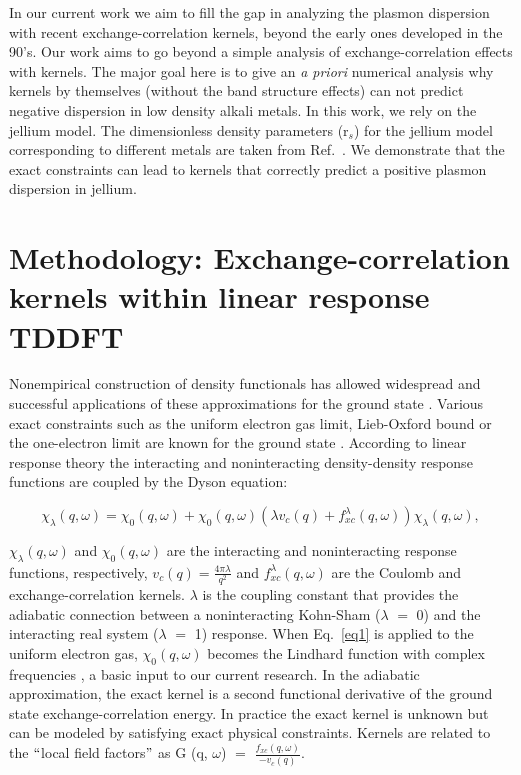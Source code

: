 \documentclass[aps,amsmath,amssymb, preprint, 12pt]{revtex4-1}
\begin{document}
In our current work we aim to fill the gap in analyzing the plasmon dispersion with recent exchange-correlation kernels, beyond the early ones developed in the 90's. Our work aims to go beyond a simple analysis of exchange-correlation effects with kernels. The major goal here is to give an \textit{a priori }numerical analysis why kernels by themselves (without the band structure effects) can not predict negative dispersion in low density alkali metals. In this work, we rely on the jellium model. The dimensionless density parameters (r$_s$) for the jellium model corresponding to different metals are taken from Ref.~\cite{AM05}. We demonstrate that the exact constraints can lead to kernels that correctly predict a positive plasmon dispersion in jellium.

\section{Methodology: Exchange-correlation kernels within linear response TDDFT}

Nonempirical construction of density functionals has allowed widespread and successful applications of these approximations for the ground state \cite{SRZSRP16}. Various exact constraints such as the uniform electron gas limit, Lieb-Oxford bound or the one-electron limit are known for the ground state \cite{PRTSSC05}. According to linear response theory the interacting and noninteracting density-density response functions are coupled by the Dyson equation:

\begin{equation}
\chi _{ \lambda } \left( q, \omega  \right) =  \chi _{0} \left( q, \omega  \right) + \chi _{0} \left( q, \omega  \right)  \left(  \lambda v_{c} \left( q \right) +f_{xc}^{ \lambda } \left( q, \omega  \right)  \right)  \chi _{ \lambda } \left( q, \omega  \right),
\label{eq1}
\end{equation}

\noindent $\chi _{ \lambda } ( q, \omega )$  and   $\chi _{0} ( q, \omega )$  are the interacting and noninteracting response functions, respectively,  \( v_{c} \left( q \right) =\frac{4 \pi \lambda }{q^{2}} \)  and  \( f_{xc}^{ \lambda } \left( q, \omega  \right)  \)  are the Coulomb and exchange-correlation kernels. $ \lambda $  is the coupling constant that provides the adiabatic connection between a noninteracting Kohn-Sham ($\lambda$ $=$ 0) and the interacting real system ($\lambda$ $=$ 1) response. When Eq.~\ref{eq1} is applied to the uniform electron gas,  \(  \chi _{0} \left( q, \omega  \right)  \)  becomes the Lindhard function with complex frequencies \cite{L54}, a basic input to our current research. In the adiabatic approximation, the exact kernel is a second functional derivative of the ground state exchange-correlation energy. In practice the exact kernel is unknown but can be modeled by satisfying exact physical constraints. Kernels are related to the $``$local field factors$"$  as
G (q, $\omega$) $=$ $\frac{f_{xc}(q, \omega)}{-v_c (q)}$.\\
\end{document}
